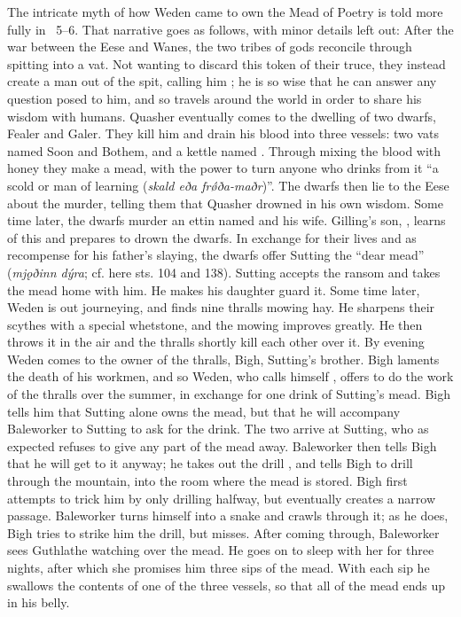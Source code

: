 The intricate myth of how Weden came to own the Mead of Poetry is told more fully in \Skaldskaparmal\ 5–6. That narrative goes as follows, with minor details left out:
After the war between the Eese and Wanes, the two tribes of gods reconcile through spitting into a vat. Not wanting to discard this token of their truce, they instead create a man out of the spit, calling him ; he is so wise that he can answer any question posed to him, and so travels around the world in order to share his wisdom with humans.
Quasher eventually comes to the dwelling of two dwarfs, Fealer and Galer. They kill him and drain his blood into three vessels: two vats named Soon and Bothem, and a kettle named . Through mixing the blood with honey they make a mead, with the power to turn anyone who drinks from it “a scold or man of learning (\emph{skald eða frǿða-maðr})”. The dwarfs then lie to the Eese about the murder, telling them that Quasher drowned in his own wisdom.
Some time later, the dwarfs murder an ettin named  and his wife. Gilling’s son, , learns of this and prepares to drown the dwarfs. In exchange for their lives and as recompense for his father’s slaying, the dwarfs offer Sutting the “dear mead” (\emph{mjǫðinn dýra}; cf. here sts. 104 and 138). Sutting accepts the ransom and takes the mead home with him. He makes his daughter  guard it.
Some time later, Weden is out journeying, and finds nine thralls mowing hay. He sharpens their scythes with a special whetstone, and the mowing improves greatly. He then throws it in the air and the thralls shortly kill each other over it. By evening Weden comes to the owner of the thralls, Bigh, Sutting’s brother. Bigh laments the death of his workmen, and so Weden, who calls himself , offers to do the work of the thralls over the summer, in exchange for one drink of Sutting’s mead. Bigh tells him that Sutting alone owns the mead, but that he will accompany Baleworker to Sutting to ask for the drink.
The two arrive at Sutting, who as expected refuses to give any part of the mead away. Baleworker then tells Bigh that he will get to it anyway; he takes out the drill , and tells Bigh to drill through the mountain, into the room where the mead is stored. Bigh first attempts to trick him by only drilling halfway, but eventually creates a narrow passage. Baleworker turns himself into a snake and crawls through it; as he does, Bigh tries to strike him the drill, but misses.
After coming through, Baleworker sees Guthlathe watching over the mead. He goes on to sleep with her for three nights, after which she promises him three sips of the mead. With each sip he swallows the contents of one of the three vessels, so that all of the mead ends up in his belly.
